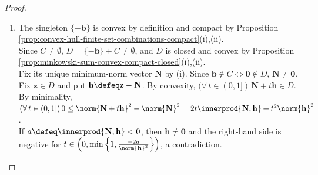 \begin{theorem}
\begin{proof}
\begin{enumerate}[label=(\roman*)]
Thus $b_{q,r}-a_{q,r}\to0$, and the intervals $[a_{q,r},b_{q,r}]$ are nested. Put $N_r\defeq\sup\{a_{q,r}:q\geq1\}$.\\
Nestedness implies $(\forall\,q\geq1)\,[a_{q,r}\leq N_r\leq b_{q,r}\land(\forall\,j\geq q)\,\abs{x_{j,r}-N_r}\leq b_{q,r}-a_{q,r}]$, so $x_{j,r}\to N_r$.\\
For $\mathbf{N}_C\defeq(N_1,\ldots,N_n)$, $\norm{\mathbf{x}_j-\mathbf{N}_C}^2=\sum\limits_{r=1}^{n}\abs{x_{j,r}-N_r}^2\to0$.\\
If $\mathbf{N}_C\notin C$, choose $\rho>0$ with $B_\rho(\mathbf{N}_C)\subseteq\R^n\setminus C$ by openness of $\R^n\setminus C$.\\
$(\exists\,j\geq1)\,\mathbf{x}_j\in B_\rho(\mathbf{N}_C)\subseteq\R^n\setminus C$ by convergence. This contradicts $(\mathbf{x}_j)_{j\geq1}\subseteq C$, so $\mathbf{N}_C\in C$.\\
By Proposition \ref{prop:reverse-triangle-inequality-inner-product}, $\norm{\mathbf{x}_j}\to\norm{\mathbf{N}_C}$, and therefore $\norm{\mathbf{N}_C}^2=m$.\\
If $\mathbf{u},\mathbf{v}\in C$ both have squared norm $m$, then $\mathbf{w}\defeq\frac{1}{2}(\mathbf{u}+\mathbf{v})\in C$ by convexity.\\
By Theorem \ref{thm:parallelogram-identity-inner-product}, $m\leq\norm{\mathbf{w}}^2=m-\frac{1}{4}\norm{\mathbf{u}-\mathbf{v}}^2$, so $\mathbf{u}=\mathbf{v}$.
\item The singleton $\{-\mathbf{b}\}$ is convex by definition and compact by Proposition \ref{prop:convex-hull-finite-set-combinations-compact}(i),(ii).\\
Since $C\neq\emptyset$, $D=\{-\mathbf{b}\}+C\neq\emptyset$, and $D$ is closed and convex by Proposition \ref{prop:minkowski-sum-convex-compact-closed}(i),(ii).\\
Fix its unique minimum-norm vector $\mathbf{N}$ by (i). Since $\mathbf{b}\notin C\Longleftrightarrow\mathbf{0}\notin D$, $\mathbf{N}\neq\mathbf{0}$.\\
Fix $\mathbf{z}\in D$ and put $\mathbf{h}\defeq\mathbf{z}-\mathbf{N}$. By convexity, $(\forall\,t\in(0,1])\,\mathbf{N}+t\mathbf{h}\in D$.\\
By minimality, $(\forall\,t\in(0,1])\,0\leq\norm{\mathbf{N}+t\mathbf{h}}^2-\norm{\mathbf{N}}^2=2t\innerprod{\mathbf{N},\mathbf{h}}+t^2\norm{\mathbf{h}}^2$.\\
If $a\defeq\innerprod{\mathbf{N},\mathbf{h}}<0$, then $\mathbf{h}\neq\mathbf{0}$ and the right-hand side is negative for $t\in\left(0,\min\left\{1,\frac{-2a}{\norm{\mathbf{h}}^2}\right\}\right)$, a contradiction.\\

\end{enumerate}
\end{proof}
\end{theorem}
